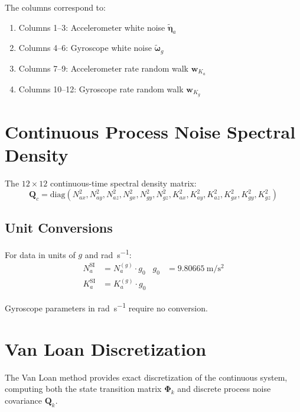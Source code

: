 \documentclass[11pt,a4paper]{article}
\newcommand{\mat}[1]{\mathbf{#1}}
\newcommand{\vect}[1]{\boldsymbol{#1}}
\begin{document}
The columns correspond to:
\begin{enumerate}
    \item Columns 1--3: Accelerometer white noise $\tilde{\vect{\eta}}_a$
    \item Columns 4--6: Gyroscope white noise $\tilde{\vect{\omega}}_g$
    \item Columns 7--9: Accelerometer rate random walk $\mat{w}_{K_a}$
    \item Columns 10--12: Gyroscope rate random walk $\mat{w}_{K_g}$
\end{enumerate}

\section{Continuous Process Noise Spectral Density}

The $12 \times 12$ continuous-time spectral density matrix:
\begin{equation}
    \mat{Q}_c = \text{diag}\left(
        N_{ax}^2, N_{ay}^2, N_{az}^2,
        N_{gx}^2, N_{gy}^2, N_{gz}^2,
        K_{ax}^2, K_{ay}^2, K_{az}^2,
        K_{gx}^2, K_{gy}^2, K_{gz}^2
    \right)
\end{equation}

\subsection{Unit Conversions}

For data in units of $g$ and \si{\radian\per\second}:
\begin{align}
    N_a^{\text{SI}} &= N_a^{(g)} \cdot g_0 & g_0 &= \SI{9.80665}{\meter\per\second\squared} \\
    K_a^{\text{SI}} &= K_a^{(g)} \cdot g_0
\end{align}

Gyroscope parameters in \si{\radian\per\second} require no conversion.

\section{Van Loan Discretization}

The Van Loan method provides exact discretization of the continuous system, computing both the state transition matrix $\vect{\Phi}_k$ and discrete process noise covariance $\mat{Q}_k$.
\end{document}
